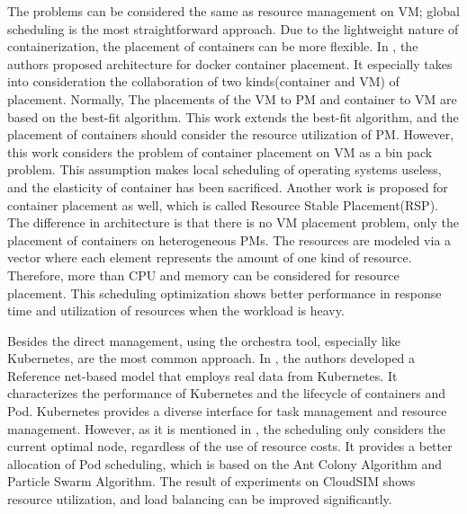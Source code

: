 \documentclass[sigchi]{acmart}
\begin{document}
The problems can be considered the same as resource management on VM; global scheduling is the most straightforward approach.
Due to the lightweight nature of containerization, the placement of containers can be more flexible.
In \cite{zhang2018container}, the authors proposed architecture for docker container placement.
It especially takes into consideration the collaboration of two kinds(container and VM) of placement.
Normally, The placements of the VM to PM and container to VM are based on the best-fit algorithm.
This work extends the best-fit algorithm, and the placement of containers should consider the resource utilization of PM.
However, this work considers the problem of container placement on VM as a bin pack problem. This assumption makes local scheduling of operating systems useless, and the elasticity of container has been sacrificed.
Another work\cite{7023588} is proposed for container placement as well, which is called Resource Stable Placement(RSP). The difference in architecture is that there is no VM placement problem, only the placement of containers on heterogeneous PMs.
The resources are modeled via a vector where each element represents the amount of one kind of resource.
Therefore, more than CPU and memory can be considered for resource placement.
This scheduling optimization shows better performance in response time and utilization of resources when the workload is heavy.

Besides the direct management, using the orchestra tool, especially like Kubernetes, are the most common approach.
In \cite{medel2016modelling}, the authors developed a Reference net-based model that employs real data from Kubernetes.
It characterizes the performance of Kubernetes and the lifecycle of containers and Pod. 
Kubernetes provides a diverse interface for task management and resource management.
However, as it is mentioned in \cite{wei2018research}, the scheduling only considers the current optimal node, regardless of the use of resource costs.
It provides a better allocation of  Pod scheduling, which is based on the Ant Colony Algorithm and Particle Swarm Algorithm.
The result of experiments on CloudSIM shows resource utilization, and load balancing can be improved significantly.


\newpage  


\end{document}
